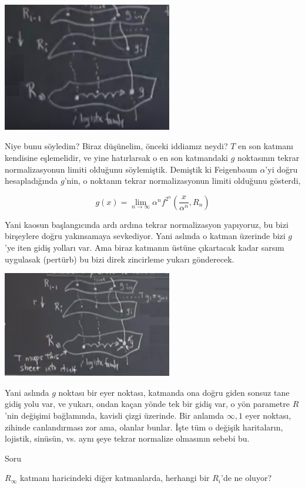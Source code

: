 \documentclass[12pt,fleqn]{article}\usepackage{../../common}
\begin{document}
\includegraphics[width=20em]{22_08.png}

Niye bunu söyledim? Biraz düşünelim, önceki iddiamız neydi? $T$ en son katmanı
kendisine eşlemelidir, ve yine hatırlarsak o en son katmandaki $g$ noktasının
tekrar normalizasyonun limiti olduğunu söylemiştik. Demiştik ki Feigenbaum
$\alpha$'yi doğru hesapladığında $g$'nin, o noktanın tekrar normalizasyonun
limiti olduğunu gösterdi, 

$$ 
g(x) = \lim_{n \to \infty}  
\alpha^n f^{2^n} \left(\frac{x}{\alpha^{n}}, R_n\right) 
$$

Yani kaosun başlangıcında ardı ardına tekrar normalizasyon yapıyoruz, bu bizi
birşeylere doğru yakınsamaya sevkediyor. Yani aslında o katman üzerinde bizi
$g$'ye iten gidiş yolları var. Ama biraz katmanın üstüne çıkartacak kadar sarsım
uygulasak (pertürb) bu bizi direk zincirleme yukarı gönderecek.

\includegraphics[width=20em]{22_09.png}

Yani aslında $g$ noktası bir eyer noktası, katmanda ona doğru giden sonsuz tane
gidiş yolu var, ve yukarı, ondan kaçan yönde tek bir gidiş var, o yön parametre
$R$'nin değişimi bağlamında, kavisli çizgi üzerinde. Bir anlamda $\infty,1$ eyer
noktası, zihinde canlandırması zor ama, olanlar bunlar. İşte tüm o değişik
haritaların, lojistik, sinüsün, vs. aynı şeye tekrar normalize olmasının sebebi
bu. 


Soru

$R_\infty$ katmanı haricindeki diğer katmanlarda, herhangi bir $R_i$'de ne
oluyor?
\end{document}
